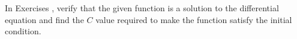 {\noindent In Exercises}
{, verify that the given function is a solution to the differential equation and find the $C$ value required to make the function satisfy the initial condition.}
